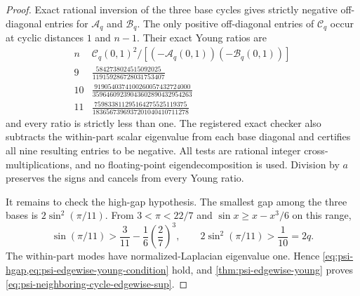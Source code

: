 \documentclass[11pt]{article}
\begin{document}
\begin{proof}
Exact rational inversion of the three base cycles gives strictly negative
off-diagonal entries for $\mathcal A_q$ and $\mathcal B_q$.  The only positive
off-diagonal entries of $\mathcal C_q$ occur at cyclic distances $1$ and
$n-1$.  Their exact Young ratios are
\begin{equation*}
 \begin{array}{c|c}
 n & \mathcal C_q(0,1)^2/
       [(-\mathcal A_q(0,1))(-\mathcal B_q(0,1))]\\
 \hline
 9 & \displaystyle
 \frac{5842738024515092025}{119159286728031753407}\\[2mm]
 10 & \displaystyle
 \frac{9190540374100260057432724000}
 {35964609239043602890432954263}\\[2mm]
 11 & \displaystyle
 \frac{759833811295164275525119375}
 {1836567396937201040410711278}
 \end{array}
\end{equation*}
and every ratio is strictly less than one.  The registered exact checker also
subtracts the within-part scalar eigenvalue from each base diagonal and
certifies all nine resulting entries to be negative.  All tests are rational
integer cross-multiplications, and no floating-point eigendecomposition is
used.  Division by $a$ preserves the signs and cancels from every Young ratio.

It remains to check the high-gap hypothesis.  The smallest gap among the
three bases is $2\sin^2(\pi/11)$.  From $3<\pi<22/7$ and
$\sin x\geq x-x^3/6$ on this range,
\begin{equation*}
 \sin(\pi/11)>
 \frac3{11}-\frac16\left(\frac2{7}\right)^3,
 \qquad
 2\sin^2(\pi/11)>\frac1{10}=2q.
\end{equation*}
The within-part modes have normalized-Laplacian eigenvalue one.  Hence
\cref{eq:psi-hgap,eq:psi-edgewise-young-condition} hold, and
\cref{thm:psi-edgewise-young} proves \cref{eq:psi-neighboring-cycle-edgewise-sup}.
\end{proof}


\end{document}
